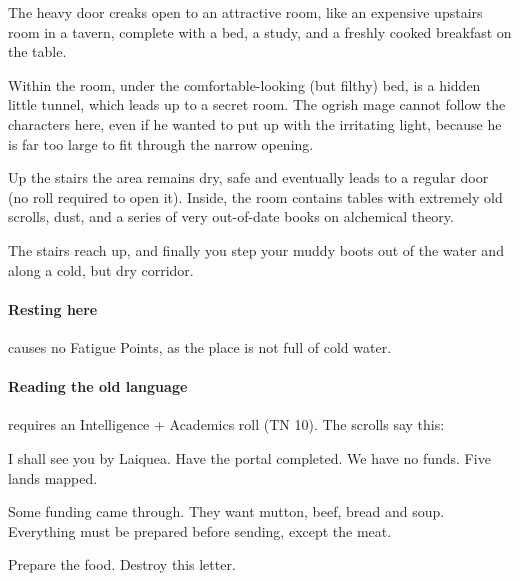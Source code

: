 \begin{boxtext}
  The heavy door creaks open to an attractive room, like an expensive upstairs room in a tavern, complete with a bed, a study, and a freshly cooked breakfast on the table.
\end{boxtext}

Within the room, under the comfortable-looking (but filthy) bed, is a hidden little tunnel, which leads up to a secret room.
The ogrish mage cannot follow the characters here, even if he wanted to put up with the irritating light, because he is far too large to fit through the narrow opening.


Up the stairs the area remains dry, safe and eventually leads to a regular door (no roll required to open it).
Inside, the room contains tables with extremely old scrolls, dust, and a series of very out-of-date books on alchemical theory.

\begin{boxtext}

  The stairs reach up, and finally you step your muddy boots out of the water and along a cold, but dry corridor.

\end{boxtext}

\paragraph{Resting here}
causes no Fatigue Points, as the place is not full of cold water.

\paragraph{Reading the old language}
requires an Intelligence + Academics roll (TN 10).
The scrolls say this:

\begin{exampletext}

  I shall see you by Laiquea.  Have the portal completed.  We have no funds.  Five lands mapped.

\end{exampletext}

\begin{exampletext}

  Some funding came through.  They want mutton, beef, bread and soup.  Everything must be prepared before sending, except the meat.

  Prepare the food.  Destroy this letter.

\end{exampletext}

